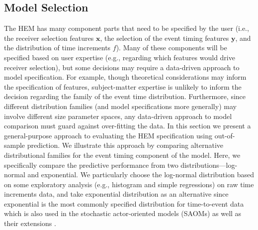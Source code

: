 \documentclass[ba]{imsart}
\numberwithin{equation}{section}
\theoremstyle{plain}
\begin{document}
	\subsection{Model Selection}\label{subsec:Experiment_email}
	
	The HEM has many component parts that need to be specified by the user (i.e., the receiver selection features $\boldsymbol{x}$, the selection of the event timing features $\boldsymbol{y}$, and the distribution of time increments $f$). Many of these components will be specified based on user expertise (e.g., regarding which features would drive receiver selection), but some decisions may require a data-driven approach to model specification. For example, though theoretical considerations may inform the specification of features, subject-matter expertise is unlikely to inform the decision regarding the family of the event time distribution. Furthermore, since different distribution families (and model specifications more generally) may involve different size parameter spaces, any data-driven approach to model comparison must guard against over-fitting the data. In this section we present a general-purpose approach to evaluating the HEM specification using out-of-sample prediction. We illustrate this approach by comparing alternative distributional families for the event timing component of the model. Here, we specifically compare the predictive performance from two distributions---log-normal and exponential. We particularly choose the log-normal distribution based on some exploratory analysis (e.g., histogram and simple regressions) on raw time increments data, and take exponential distribution as an alternative since exponential is the most commonly specified distribution for time-to-event data which is also used in the stochastic actor-oriented models (SAOMs) \citep{snijders1996stochastic} as well as their extensions \citep{snijders2007modeling}. 
\end{document}
